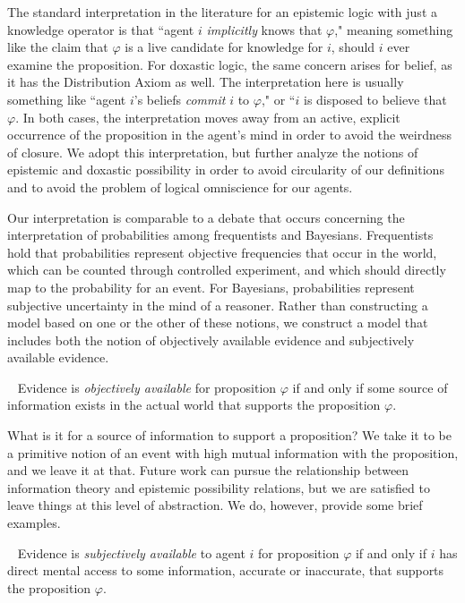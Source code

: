 The standard interpretation in the literature for an epistemic logic with just a knowledge operator is that ``agent $i$ \emph{implicitly} knows that $\varphi$," meaning something like the claim that $\varphi$ is a live candidate for knowledge for $i$, should $i$ ever examine the proposition. For doxastic logic, the same concern arises for belief, as it has the Distribution Axiom as well. The interpretation here is usually something like ``agent $i$'s beliefs \emph{commit} $i$ to $\varphi$," or ``$i$ is disposed to believe that $\varphi$. In both cases, the interpretation moves away from an active, explicit occurrence of the proposition in the agent's mind in order to avoid the weirdness of closure. We adopt this interpretation, but further analyze the notions of epistemic and doxastic possibility in order to avoid circularity of our definitions and to avoid the problem of logical omniscience for our agents.

Our interpretation is comparable to a debate that occurs concerning the interpretation of probabilities among frequentists and Bayesians. Frequentists hold that probabilities represent objective frequencies that occur in the world, which can be counted through controlled experiment, and which should directly map to the probability for an event. For Bayesians, probabilities represent subjective uncertainty in the mind of a reasoner. Rather than constructing a model based on one or the other of these notions, we construct a model that includes both the notion of objectively available evidence and subjectively available evidence.

\begin{definition}~\label{obj_ev}
	Evidence is \emph{objectively available} for proposition $\varphi$ if and only if some source of information exists in the actual world that supports the proposition $\varphi$.
\end{definition}

What is it for a source of information to support a proposition? We take it to be a primitive notion of an event with high mutual information with the proposition, and we leave it at that. Future work can pursue the relationship between information theory and epistemic possibility relations, but we are satisfied to leave things at this level of abstraction. We do, however, provide some brief examples.

\begin{definition}~\label{subj_ev}
	Evidence is \emph{subjectively available} to agent $i$ for proposition $\varphi$ if and only if $i$ has direct mental access to some information, accurate or inaccurate, that supports the proposition $\varphi$.
\end{definition}

